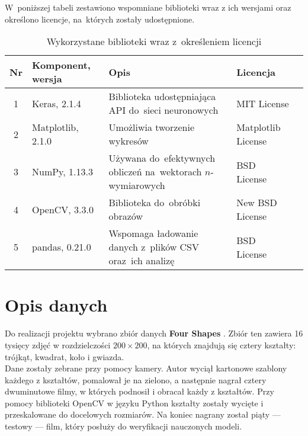 \documentclass[11pt,a4paper]{article}
\begin{document}
W~poniższej tabeli zestawiono wspomniane biblioteki wraz z ich wersjami oraz określono licencje, na~których zostały udostępnione.
\begin{table}[H]
    \begin{tabularx}{\textwidth}{|c|l|X|l|c|}
        \hline
        \textbf{Nr} & \textbf{Komponent, wersja} & \textbf{Opis} & \textbf{Licencja} & \\
        \hline
        \hline
        1 &
        Keras, 2.1.4 &
        Biblioteka udostępniająca API do~sieci neuronowych &
        MIT License &
        \cite{keras} \\
        \hline
        2 & 
        Matplotlib, 2.1.0 & 
        Umożliwia tworzenie wykresów &
        Matplotlib License &
        \cite{matplotlib} \\
        \hline
        3 & 
        NumPy, 1.13.3 &
        Używana do~efektywnych obliczeń na~wektorach $n$-wymiarowych &
        BSD License &
        \cite{numpy} \\
        \hline
        4 & 
        OpenCV, 3.3.0 &
        Biblioteka do~obróbki obrazów &
        New BSD License &
        \cite{opencv} \\
        \hline
        5 &
        pandas, 0.21.0 &
        Wspomaga ładowanie danych z~plików CSV oraz~ich analizę &
        BSD License &
        \cite{pandas} \\
        \hline
    \end{tabularx}
    \caption{Wykorzystane biblioteki wraz z~określeniem licencji}
\end{table}

\section{Opis danych}

Do realizacji projektu wybrano zbiór danych \textbf{Four Shapes} \cite{shapes}. Zbiór ten zawiera 16 tysięcy zdjęć w rozdzielczości $200 \times 200$, na których znajdują się cztery kształty: trójkąt, kwadrat, koło i gwiazda.\\

Dane zostały zebrane przy pomocy kamery. Autor wyciął kartonowe szablony każdego z kształtów, pomalował je na zielono, a następnie nagrał cztery dwuminutowe filmy, w których podnosił i obracał każdy z kształtów. Przy pomocy biblioteki OpenCV w języku Python kształty zostały wycięte i przeskalowane do docelowych rozmiarów. Na koniec nagrany został piąty --- testowy --- film, który posłuży do weryfikacji nauczonych modeli.\\
\end{document}
